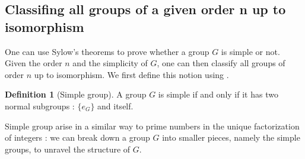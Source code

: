 \documentclass{article}
\theoremstyle{definition}
\theoremstyle{plain}
\theoremstyle{plain}
\theoremstyle{plain}
\theoremstyle{plain}
\theoremstyle{definition}
\newtheorem{defeng}[subsubsection]{Definition}
\theoremstyle{plain}
\newtheorem{thmeng}[subsubsection]{Theorem}
\theoremstyle{plain}
\begin{document}
\subsection{Classifing all groups of a given order n up to isomorphism}

\par One can use Sylow's theorems to prove whether a group \( G \) is simple or not. Given the order \( n \) and the simplicity of \( G \), one can then classify all groups of order \( n \) up to isomorphism. We first define this notion using \cite[p.~103]{dummit2003abstract}.


\begin{defeng}[Simple group]
	A group \( G \) is simple if and only if it has two normal subgroups : 
	\( \{e_G\} \) and itself.
\end{defeng}

\par Simple group arise in a similar way to prime numbers in the unique factorization of integers : we can break down a group \( G \) into smaller pieces, namely the simple groups, to unravel the structure of \( G \).



\end{document}
